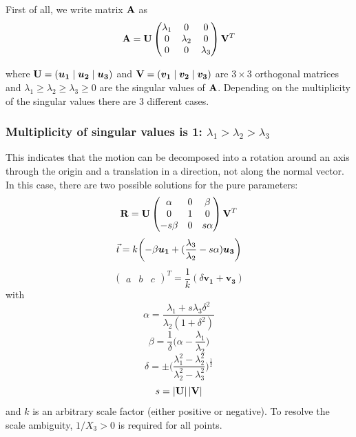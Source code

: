First of all, we write matrix $\mathbf{A}$ as 
\begin{equation}
    \mathbf{A} = \mathbf{U}
    \begin{pmatrix}
        \lambda_1 & 0 & 0 \\
        0 & \lambda_2 & 0 \\
        0 & 0 & \lambda_3
    \end{pmatrix}\mathbf{V}^T
\end{equation}

where $\mathbf{U} = (\boldsymbol{u_1}\mid\boldsymbol{u_2}\mid\boldsymbol{u_3})$ and $\mathbf{V} = (\boldsymbol{v_1}\mid\boldsymbol{v_2}\mid\boldsymbol{v_3})$ are $3\times 3$ orthogonal matrices and $\lambda_1\geq\lambda_2\geq\lambda_3\geq 0$ are the singular values of $\mathbf{A}$. Depending on the multiplicity of the singular values there are 3 different cases.

\subsubsection{Multiplicity of singular values is 1: $\lambda_1 > \lambda_2 > \lambda_3$}

This indicates that the motion can be decomposed into a rotation around an axis through the origin and a translation in a direction, not along the normal vector. In this case, there are two possible solutions for the pure parameters:
\begin{equation*}
    \mathbf{R} = \mathbf{U}
    \begin{pmatrix}
        \alpha & 0 & \beta \\
        0 & 1 & 0 \\
        -s\beta & 0 & s\alpha
    \end{pmatrix}
    \mathbf{V}^T
\end{equation*}
\begin{equation*}
    \vec t = k\biggl(-\beta\boldsymbol{u_1} + (\frac{\lambda_3}{\lambda_2}-s\alpha)\boldsymbol{u_3}\biggr)
\end{equation*}
\begin{equation*}
    \begin{pmatrix}
        a & b & c
    \end{pmatrix}^T = \frac{1}{k}(\delta\boldsymbol{v_1} + \boldsymbol{v_3})
\end{equation*}
with
\begin{equation*}
    \alpha = \frac{\lambda_1 + s\lambda_3\delta^2}{\lambda_2(1+\delta^2)}
\end{equation*}
\begin{equation*}
    \beta = \frac{1}{\delta}\biggl(\alpha-\frac{\lambda_1}{\lambda_2}\biggr)
\end{equation*}
\begin{equation*}
    \delta = \pm\biggl(\frac{\lambda_1^2-\lambda_2^2}{\lambda_2^2-\lambda_3^2}\biggr)^\frac{1}{2}
\end{equation*}
\begin{equation*}
    s = \left| {\mathbf{U}} \right| \left| {\mathbf{V}} \right|
\end{equation*}
and $k$ is an arbitrary scale factor (either positive or negative). To resolve the scale ambiguity, $1/X_3 > 0$ is required for all points.

